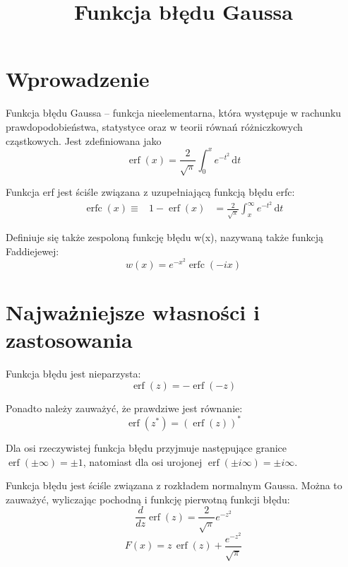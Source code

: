 \documentclass{article}
\begin{document}
\title{Funkcja błędu Gaussa}
\maketitle

\section*{Wprowadzenie}
Funkcja błędu Gaussa – funkcja nieelementarna, która występuje w rachunku prawdopodobieństwa, statystyce oraz w teorii równań różniczkowych cząstkowych. Jest zdefiniowana jako 
\begin{equation*}
\operatorname {erf} (x)={\frac {2}{\sqrt {\pi }}}\int _{0}^{x}e^{-t^{2}}\,\mathrm {d} t
\end{equation*}

Funkcja erf jest ściśle związana z uzupełniającą funkcją błędu erfc:
\begin{eqnarray*}
\operatorname{erfc}(x) \equiv & 1-\operatorname{erf}(x) & = {\frac{2}{\sqrt{\pi}}}\int _{x}^{\infty }e^{-t^{2}}\,\mathrm {d} t
\end{eqnarray*}

Definiuje się także zespoloną funkcję błędu w(x), nazywaną także funkcją Faddiejewej: 
$$ w(x)=e^{-x^{2}}\operatorname {erfc} \left(-ix\right) $$

\section*{Najważniejsze własności i zastosowania}
Funkcja błędu jest nieparzysta: 
\begin{displaymath}
\operatorname {erf} (z)=-\operatorname {erf} \left(-z\right)
\end{displaymath}

Ponadto należy zauważyć, że prawdziwe jest równanie:
\begin{equation*}
\operatorname {erf} \left(z^{*}\right)=\left(\operatorname {erf} (z)\right)^{*}
\end{equation*}

Dla osi rzeczywistej funkcja błędu przyjmuje następujące granice \( \operatorname {erf} \left(\pm \infty \right)=\pm 1 \), natomiast dla osi urojonej $ \operatorname {erf} \left(\pm i\infty \right)=\pm i\infty $.

Funkcja błędu jest ściśle związana z rozkładem normalnym Gaussa. Można to zauważyć, wyliczając pochodną i funkcję pierwotną funkcji błędu: 
\begin{displaymath}
{\frac {d}{dz}}\operatorname {erf} (z)={\frac {2}{\sqrt {\pi }}}e^{-z^{2}}
\end{displaymath}
$$ F(x)=z\,\operatorname {erf} (z)+{\frac {e^{-z^{2}}}{\sqrt {\pi }}} $$
\end{document}
